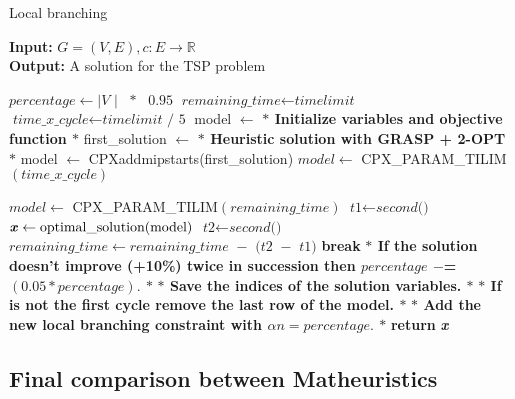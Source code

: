 \begin{algorithm} [H]
    \caption{Local branching}\label{Local branching}
    \hspace*{\algorithmicindent} \textbf{Input:} $G = (V,E) , c : E \rightarrow \mathbb{R}$\\
    \hspace*{\algorithmicindent} \textbf{Output:}  A solution for the TSP problem
    \begin{algorithmic}[1]
    \State $\textit{percentage} \gets \textit{$|$V $|$ $\ast$ $0.95$}$
    \State $\textit{remaining\_time} \gets \textit{timelimit}$
    \State $\textit{time\_x\_cycle} \gets \textit{timelimit / 5}$
    \State model $ \leftarrow $ \textbf{$\ast$ Initialize variables and objective function $\ast$ }
    \State first\_solution $ \leftarrow $ \textbf{$\ast$ Heuristic solution with GRASP + 2-OPT $\ast$ }
    \State model $ \leftarrow $  CPXaddmipstarts(first\_solution)
	\State $ model \gets $ CPX\_PARAM\_TILIM$(\textit{time\_x\_cycle}) $
	
	\Else \State $ model \gets $ CPX\_PARAM\_TILIM$(\textit{remaining\_time}) $
	\EndIf
	\State $\textit{t1} \gets \textit{second()}$
    	\State $\textbf{\textit{x}} \gets \text{optimal\_solution}(\text{model}) $\;
	\State $\textit{t2} \gets \textit{second()}$
	\State $\textit{remaining\_time} \gets \textit{remaining\_time $-$ (t2 $-$ t1)}$
	\State \textbf{break}
	\EndIf
	\State \textbf{$\ast$ If the solution doesn't improve (+10\%) twice in succession then $ percentage $ $ -$= $ (0.05 \ast percentage).$ $\ast$}
	\State \textbf{$\ast$ Save the indices of the solution variables. $\ast$}
	\State \textbf{$\ast$ If is not the first cycle remove the last row of the model. $\ast$}
	\State \textbf{$\ast$ Add the new local branching constraint with $\alpha n = percentage. $ $\ast$}
    \EndWhile
    \State \textbf{return} \textbf{\textit{x}}
    \end{algorithmic}
    \end{algorithm}

\subsection{Final comparison between Matheuristics}
